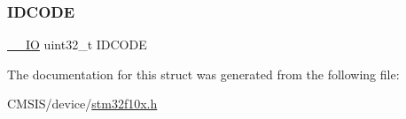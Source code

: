 \subsubsection{\texorpdfstring{IDCODE}{IDCODE}}
{\footnotesize\ttfamily \mbox{\hyperlink{core__sc300_8h_aec43007d9998a0a0e01faede4133d6be}{\+\_\+\+\_\+\+IO}} uint32\+\_\+t I\+D\+C\+O\+DE}



The documentation for this struct was generated from the following file\+:\begin{DoxyCompactItemize}
\item 
C\+M\+S\+I\+S/device/\mbox{\hyperlink{stm32f10x_8h}{stm32f10x.\+h}}\end{DoxyCompactItemize}
